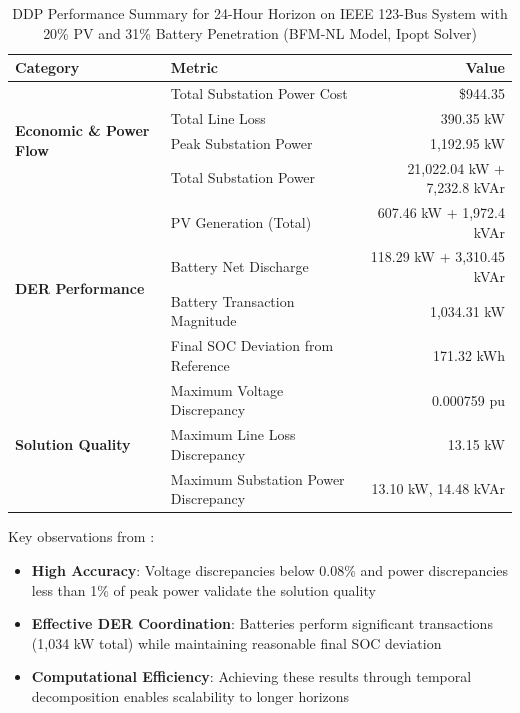 \begin{table}[h]
\centering
\caption{DDP Performance Summary for 24-Hour Horizon on IEEE 123-Bus System with 20\% PV and 31\% Battery Penetration (BFM-NL Model, Ipopt Solver)}
\label{tab:ddp-results}
\begin{tabular}{@{}llr@{}}
\toprule
\textbf{Category} & \textbf{Metric} & \textbf{Value} \\ 
\midrule
\multirow{4}{*}{\textbf{Economic \& Power Flow}} 
    & Total Substation Power Cost & \$944.35 \\
    & Total Line Loss & 390.35 kW \\
    & Peak Substation Power & 1,192.95 kW \\
    & Total Substation Power & 21,022.04 kW + 7,232.8 kVAr \\
\midrule
\multirow{4}{*}{\textbf{DER Performance}} 
    & PV Generation (Total) & 607.46 kW + 1,972.4 kVAr \\
    & Battery Net Discharge & 118.29 kW + 3,310.45 kVAr \\
    & Battery Transaction Magnitude & 1,034.31 kW \\
    & Final SOC Deviation from Reference & 171.32 kWh \\
\midrule
\multirow{3}{*}{\textbf{Solution Quality}} 
    & Maximum Voltage Discrepancy & 0.000759 pu \\
    & Maximum Line Loss Discrepancy & 13.15 kW \\
    & Maximum Substation Power Discrepancy & 13.10 kW, 14.48 kVAr \\
\bottomrule
\end{tabular}
\end{table}

Key observations from :
\begin{itemize}
    \item \textbf{High Accuracy}: Voltage discrepancies below 0.08\% and power discrepancies less than 1\% of peak power validate the solution quality
    \item \textbf{Effective DER Coordination}: Batteries perform significant transactions (1,034 kW total) while maintaining reasonable final SOC deviation
    \item \textbf{Computational Efficiency}: Achieving these results through temporal decomposition enables scalability to longer horizons
\end{itemize}

